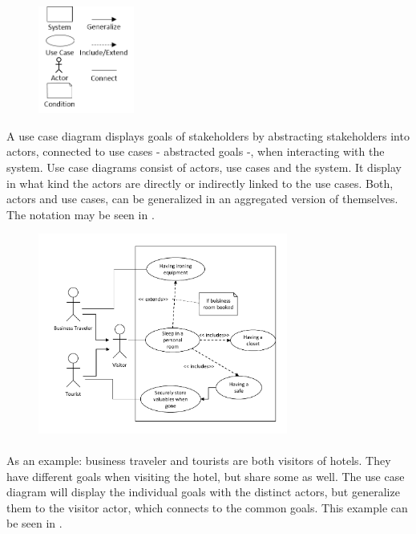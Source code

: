 \begin{figure}[H] 
    \centering
    \includegraphics[width=0.28\textwidth]{img/ucSymb.png}
    \label{fig:ucSymb}
\end{figure}

A use case diagram displays goals of stakeholders by abstracting stakeholders into actors, connected to use cases - abstracted goals -, when interacting with the system. Use case diagrams consist of actors, use cases and the system. It display in what kind the actors are directly or indirectly linked to the use cases. Both, actors and use cases, can be generalized in an aggregated version of themselves. The notation may be seen in .

\begin{figure}[H]
    \centering
    \includegraphics[width=0.73\textwidth]{img/ucEx.pdf}
    \label{fig:ucEx}
\end{figure}

\paragraph{} As an example: business traveler and tourists are both visitors of hotels. They have different goals when visiting the hotel, but share some as well. The use case diagram will display the individual goals with the distinct actors, but generalize them to the visitor actor, which connects to the common goals. This example can be seen in . 

